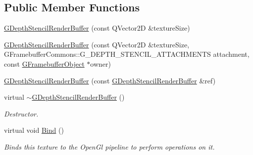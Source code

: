 \subsection*{Public Member Functions}
\begin{DoxyCompactItemize}
\item 
\mbox{\hyperlink{class_geometry_engine_1_1_geometry_buffer_1_1_g_depth_stencil_render_buffer_ad893bf8d5e68e1a4e7cf60901160cfd7}{G\+Depth\+Stencil\+Render\+Buffer}} (const Q\+Vector2D \&texture\+Size)
\item 
\mbox{\hyperlink{class_geometry_engine_1_1_geometry_buffer_1_1_g_depth_stencil_render_buffer_a27a3fc8842773b19247feb6fd25c32bd}{G\+Depth\+Stencil\+Render\+Buffer}} (const Q\+Vector2D \&texture\+Size, G\+Framebuffer\+Commons\+::\+G\+\_\+\+D\+E\+P\+T\+H\+\_\+\+S\+T\+E\+N\+C\+I\+L\+\_\+\+A\+T\+T\+A\+C\+H\+M\+E\+N\+TS attachment, const \mbox{\hyperlink{class_geometry_engine_1_1_geometry_buffer_1_1_g_framebuffer_object}{G\+Framebuffer\+Object}} $\ast$owner)
\item 
\mbox{\hyperlink{class_geometry_engine_1_1_geometry_buffer_1_1_g_depth_stencil_render_buffer_a59656d1f372a0f2d3998c21202780e3c}{G\+Depth\+Stencil\+Render\+Buffer}} (const \mbox{\hyperlink{class_geometry_engine_1_1_geometry_buffer_1_1_g_depth_stencil_render_buffer}{G\+Depth\+Stencil\+Render\+Buffer}} \&ref)
\item 
\mbox{\label{class_geometry_engine_1_1_geometry_buffer_1_1_g_depth_stencil_render_buffer_a51003c8742dd39b65832732f6532ccf5}} 
virtual \mbox{\hyperlink{class_geometry_engine_1_1_geometry_buffer_1_1_g_depth_stencil_render_buffer_a51003c8742dd39b65832732f6532ccf5}{$\sim$\+G\+Depth\+Stencil\+Render\+Buffer}} ()
\begin{DoxyCompactList}\small\item\em Destructor. \end{DoxyCompactList}\item 
\mbox{\label{class_geometry_engine_1_1_geometry_buffer_1_1_g_depth_stencil_render_buffer_a6fe05ae29924f57e0de6f7f51d357084}} 
virtual void \mbox{\hyperlink{class_geometry_engine_1_1_geometry_buffer_1_1_g_depth_stencil_render_buffer_a6fe05ae29924f57e0de6f7f51d357084}{Bind}} ()
\begin{DoxyCompactList}\small\item\em Binds this texture to the Open\+Gl pipeline to perform operations on it. \end{DoxyCompactList}\item 

\end{DoxyCompactItemize}
